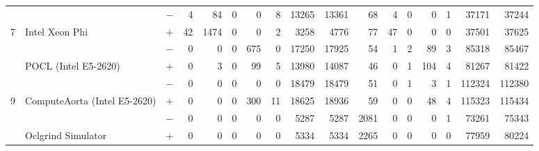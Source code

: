 \begin{tabular}{| l l l | r r r r r r r | r r r r r r r |}
  & & $-$ & 4 & 84 & 0 & 0 & 8 & 13265 & 13361 & 68 & 4 & 0 & 0 & 1 & 37171 & 37244 \\
  \multirow{-2}{*}{7} & \multirow{-2}{*}{Intel Xeon Phi} & $+$ & 42 & 1474 & 0 & 0 & 2 & 3258 & 4776 & 77 & 47 & 0 & 0 & 0 & 37501 & 37625 \\
  \rowcolor{gray!25}
  & & $-$ & 0 & 0 & 0 & 675 & 0 & 17250 & 17925 & 54 & 1 & 2 & 89 & 3 & 85318 & 85467 \\
  \rowcolor{gray!25}
  \multirow{-2}{*}{8} & \multirow{-2}{*}{POCL (Intel E5-2620)} & $+$ & 0 & 3 & 0 & 99 & 5 & 13980 & 14087 & 46 & 0 & 1 & 104 & 4 & 81267 & 81422 \\
  & & $-$ & 0 & 0 & 0 & 0 & 0 & 18479 & 18479 & 51 & 0 & 1 & 3 & 1 & 112324 & 112380 \\
  \multirow{-2}{*}{9} & \multirow{-2}{*}{ComputeAorta (Intel E5-2620)} & $+$ & 0 & 0 & 0 & 300 & 11 & 18625 & 18936 & 59 & 0 & 0 & 48 & 4 & 115323 & 115434 \\
  \rowcolor{gray!25}
  & & $-$ & 0 & 0 & 0 & 0 & 0 & 5287 & 5287 & 2081 & 0 & 0 & 0 & 1 & 73261 & 75343 \\
  \rowcolor{gray!25}
  \multirow{-2}{*}{10} & \multirow{-2}{*}{Oclgrind Simulator} & $+$ & 0 & 0 & 0 & 0 & 0 & 5334 & 5334 & 2265 & 0 & 0 & 0 & 0 & 77959 & 80224 \\
  \hline
\end{tabular}
